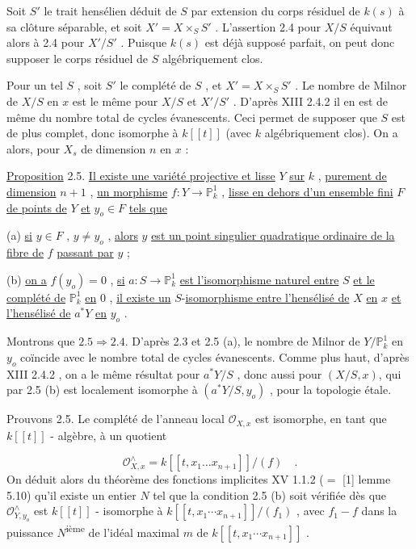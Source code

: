 Soit $S'$ le trait hensélien déduit de $S$ par extension du corps résiduel de $k(s)$ à sa clôture séparable, et soit $X' = X \times_S S'$ . L'assertion 2.4 pour $X/S$ équivaut alors à 2.4 pour $X'/S'$ . Puisque $k(s)$ est déjà supposé parfait, on peut donc supposer le corps résiduel de $S$ algébriquement clos.

Pour un tel $S$ , soit $S'$ le complété de $S$ , et $X' = X \times_S S'$ . Le nombre de Milnor de $X/S$ en $x$ est le même pour $X/S$ et $X'/S'$ . D'après XIII 2.4.2 il en est de même du nombre total de cycles évanescents. Ceci permet de supposer que $S$ est de plus complet, donc isomorphe à $k[[t]]$ (avec $k$ algébriquement clos). On a alors, pour $X_s$ de dimension $n$ en $x$ :

\underline{Proposition} 2.5. \underline{Il existe une variété projective et lisse} $Y$ \underline{sur} $k$ , \underline{purement de dimension} $n + 1$ , \underline{un morphisme} $f : Y \to \mathbb{P}^1_k$ , \underline{lisse en dehors d'un ensemble fini} $F$
\underline{de points de} $Y$ \underline{et} $y_o \in F$ \underline{tels que}

(a) \underline{si} $y \in F$ , $y \neq y_o$ , \underline{alors} $y$ \underline{est un point singulier quadratique ordinaire de la fibre de} $f$ \underline{passant par} $y$ ;

(b) \underline{on a} $f(y_o) = 0$ , \underline{si} $a : S \to \mathbb{P}^1_k$ \underline{est l'isomorphisme naturel entre} $S$ \underline{et le complété de} $\mathbb{P}^1_k$ \underline{en} $0$ , \underline{il existe un} $S$-\underline{isomorphisme entre l'hensélisé de} $X$ \underline{en} $x$ \underline{et l'hensélisé de} $a^{*}Y$ \underline{en} $y_o$ .

Montrons que $2.5 \Rightarrow 2.4$. D'après 2.3 et 2.5 (a), le nombre de Milnor de $Y/\mathbb{P}^1_k$ en $y_o$ coïncide avec le nombre total de cycles évanescents. Comme plus haut, d'après XIII 2.4.2 , on a le même résultat pour $a^{*}Y/S$ , donc aussi pour $(X/S,x)$, qui par 2.5 (b) est localement isomorphe à $(a^{*} Y/S,y_o)$ , pour la topologie étale.

Prouvons 2.5. Le complété de l'anneau local $\mathcal{O}_{X,x}$ est isomorphe, en tant que $k[[t]]$ - algèbre, à un quotient

\begin{equation*}
\mathcal{O}_{X,x}^{\wedge} = k[[t,x_1 \ldots x_{n+1}]]/(f) \quad .
\end{equation*}
On déduit alors du théorème des fonctions implicites XV 1.1.2 ($=$ [1] lemme 5.10) qu'il existe un entier $N$ tel que la condition 2.5 (b) soit vérifiée dès que $\mathcal{O}_{Y,y_o}^{\wedge}$ est $k[[t]]$ - isomorphe à $k[[t,x_1 \cdots x_{n+1}]]/(f_1)$ , avec $f_1 - f$ dans la puissance $N$\textsuperscript{ième} de l'idéal maximal $m$ de $k[[t,x_1 \cdots x_{n+1}]]$ .

